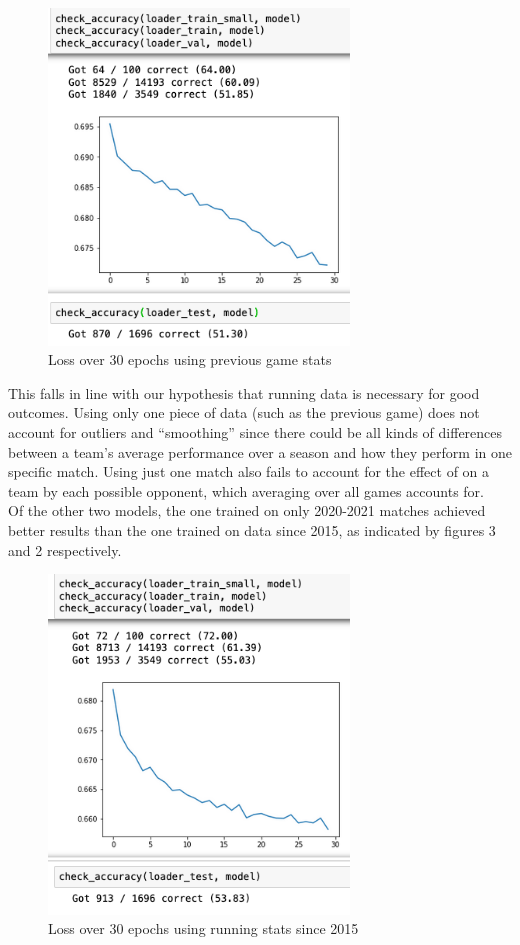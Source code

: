 \documentclass[10pt,twocolumn,letterpaper]{article}
\begin{document}
\begin{figure}[htp]
    \centering
    \includegraphics[width=8cm]{results_2016_train_non-avg.png}
    \caption{Loss over 30 epochs using previous game stats}
    \label{fig:fig_1}
\end{figure}

This falls in line with our hypothesis that running data is necessary for good outcomes. Using only one piece of data (such as the previous game) does not account for outliers and ``smoothing'' since there could be all kinds of differences between a team's average performance over a season and how they perform in one specific match. Using just one match also fails to account for the effect of on a team by each possible opponent, which averaging over all games accounts for. \\

Of the other two models, the one trained on only 2020-2021 matches achieved better results than the one trained on data since 2015, as indicated by figures 3 and 2 respectively. \\

\begin{figure}[htp]
    \centering
    \includegraphics[width=8cm]{results_2016_train.png}
    \caption{Loss over 30 epochs using running stats since 2015}
    \label{fig:fig_2}
\end{figure}
\end{document}
